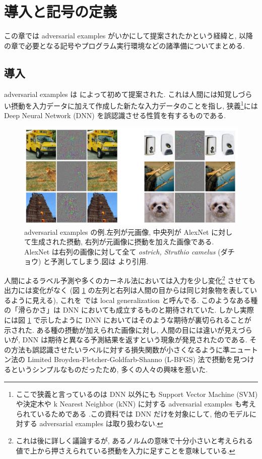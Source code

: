 \section{導入と記号の定義}
\label{sec:introduction}
この章では adversarial examples がいかにして提案されたかという経緯と, 以降の章で必要となる記号やプログラム実行環境などの諸準備についてまとめる.



\subsection{導入}
\label{subsec:introduction}
adversarial examples は \cite{szegedy2013intriguing} によって初めて提案された.
これは人間には知覚しづらい摂動を入力データに加えて作成した新たな入力データのことを指し, 狭義\footnote{ここで狭義と言っているのは DNN 以外にも Support Vector Machine (SVM) や決定木や k Nearest Neighbor (kNN) に対する adversarial examples も考えられているためである \cite{papernot2016transferability}.この資料では DNN だけを対象にして, 他のモデルに対する adversarial examples は取り扱わない.}には Deep Neural Network (DNN) を誤認識させる性質を有するものである.
%
\begin{figure}[htbp]
\begin{center}
\includegraphics[width=12.0cm]{figures/szegedy-adv-examples.pdf}
\end{center}
\caption{adversarial examples の例.左列が元画像, 中央列が AlexNet \cite{krizhevsky2012imagenet} に対して生成された摂動, 右列が元画像に摂動を加えた画像である.
AlexNet は右列の画像に対して全て \textit{ostrich, Struthio camelus} (ダチョウ) と予測してしまう.図は \cite{szegedy2013intriguing} より引用.}
\label{fig:szegedy-adv-example}
\end{figure}
%

人間によるラベル予測や多くのカーネル法においては入力を少し変化\footnote{これは後に詳しく議論するが, あるノルムの意味で十分小さいと考えられる値で上から押さえられている摂動を入力に足すことを意味している.} させても出力には変化がなく (図 \ref{fig:szegedy-adv-example} の左列と右列は人間の目からは同じ対象物を表しているように見える), これを \cite{szegedy2013intriguing} では local generalization と呼んでる. このようなある種の「滑らかさ」は DNN においても成立するものと期待されていた.
しかし実際には図 \ref{fig:szegedy-adv-example} で示したように DNN においてはそのような期待が裏切られることが示された.
ある種の摂動が加えられた画像に対し, 人間の目には違いが見えづらいが, DNN は期待と異なる予測結果を返すという現象が発見されたのである.
その方法も誤認識させたいラベルに対する損失関数が小さくなるように準ニュートン法の Limited Broyden-Fletcher-Goldfarb-Shanno (L-BFGS) 法で摂動を見つけるというシンプルなものだったため, 多くの人々の興味を惹いた.

